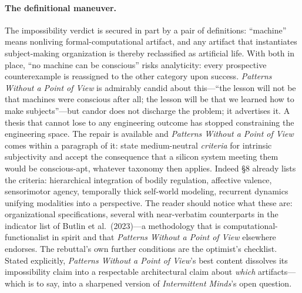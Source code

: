 \documentclass[11pt]{article}
\newcommand{\IM}{\emph{Intermittent Minds}}
\newcommand{\PP}{\emph{Patterns Without a Point of View}}
\begin{document}
\paragraph{The definitional maneuver.} The impossibility verdict is secured in part by a pair of definitions: ``machine'' means nonliving formal-computational artifact, and any artifact that instantiates subject-making organization is thereby reclassified as artificial life. With both in place, ``no machine can be conscious'' risks analyticity: every prospective counterexample is reassigned to the other category upon success. \PP{} is admirably candid about this---``the lesson will not be that machines were conscious after all; the lesson will be that we learned how to make subjects''---but candor does not discharge the problem; it advertises it. A thesis that cannot lose to any engineering outcome has stopped constraining the engineering space. The repair is available and \PP{} comes within a paragraph of it: state medium-neutral \emph{criteria} for intrinsic subjectivity and accept the consequence that a silicon system meeting them would be conscious-apt, whatever taxonomy then applies. Indeed \S 8 already lists the criteria: hierarchical integration of bodily regulation, affective valence, sensorimotor agency, temporally thick self-world modeling, recurrent dynamics unifying modalities into a perspective. The reader should notice what these are: organizational specifications, several with near-verbatim counterparts in the indicator list of Butlin et al.\ (2023)---a methodology that is computational-functionalist in spirit and that \PP{} elsewhere endorses. The rebuttal's own further conditions are the optimist's checklist. Stated explicitly, \PP{}'s best content dissolves its impossibility claim into a respectable architectural claim about \emph{which} artifacts---which is to say, into a sharpened version of \IM{}'s open question.
\end{document}
